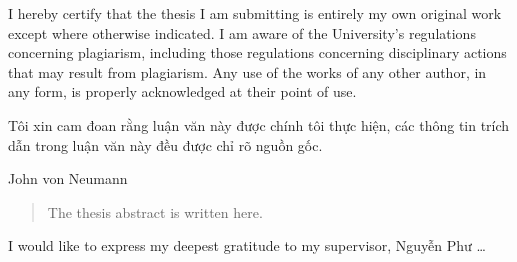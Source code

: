 \documentclass[12pt, %
oneside, %
singlespacing, %
headsepline, %
]{ThesisHCMUE}
\begin{document}

\begin{declaration}
\addchaptertocentry{\authorshipname} %
I hereby certify that the thesis I am submitting is entirely my own original work except where otherwise indicated. I am aware of the University's regulations concerning plagiarism, including those regulations concerning disciplinary actions that may result from plagiarism. Any use of the works of any other author, in any form, is properly acknowledged at their point of use.

Tôi xin cam đoan rằng luận văn này được chính tôi thực hiện, các thông tin trích dẫn trong luận văn này đều được chỉ rõ nguồn gốc.
\end{declaration}
\cleardoublepage


\vspace*{0.2\textheight}

\bigbreak

\hfill John von Neumann


\begin{abstract}
\addchaptertocentry{\abstractname} 
\thispagestyle{empty}  %
The thesis abstract is written here.
\end{abstract}


\begin{acknowledgements}
\addchaptertocentry{\acknowledgementname} %
I would like to express my deepest gratitude to my supervisor, Nguyễn Phư \ldots
\end{acknowledgements}
\end{document}
